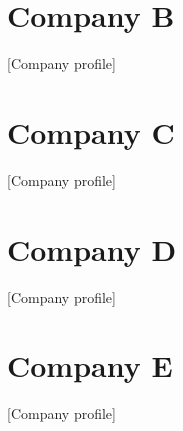 \documentclass[11pt,letterpaper]{report}
\begin{document}
\section{Company B}
[Company profile]

\section{Company C}
[Company profile]

\section{Company D}
[Company profile]

\section{Company E}
[Company profile]

\newpage



% 
% 
%

\end{document}
